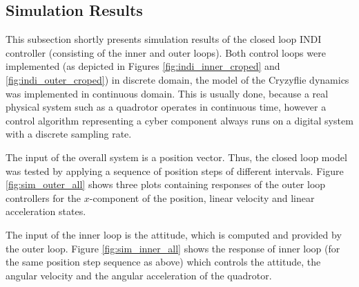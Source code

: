 \documentclass[11pt, a4paper, twoside]{report}
\begin{document}
\subsection{Simulation Results} \label{subsec:simulation_results}

This subsection shortly presents simulation results of the closed loop \acrshort{INDI} controller (consisting of the inner and outer loops). Both control loops were implemented (as depicted in Figures \ref{fig:indi_inner_croped} and \ref{fig:indi_outer_croped}) in discrete domain, the model of the Cryzyflie dynamics was implemented in continuous domain. This is usually done, because a real physical system such as a quadrotor operates in continuous time, however a control algorithm representing a cyber component always runs on a digital system with a discrete sampling rate. 

The input of the overall system is a position vector. Thus, the closed loop model was tested by applying a sequence of position steps of different intervals. Figure \ref{fig:sim_outer_all} shows three plots containing responses of the outer loop controllers for the $x$-component of the position, linear velocity and linear acceleration states. %

The input of the inner loop is the attitude, which is computed and provided by the outer loop. Figure \ref{fig:sim_inner_all} shows the response of inner loop (for the same position step sequence as above) which controls the attitude, the angular velocity and the angular acceleration of the quadrotor. 
\end{document}
